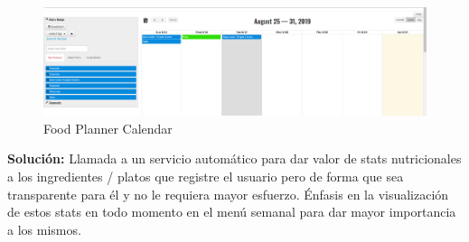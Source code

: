 \documentclass[12pt, a4paper, twoside]{book}
\begin{document}
\begin{itemize}
		\begin{center}
			\begin{figure}[H]
				\centering
				\includegraphics[width=15cm]{Imagenes/FoodPlannerCalendar.png}
				\caption{Food Planner Calendar}\label{Food Planner Calendar}
			\end{figure}
		\end{center}
		\textbf{Solución:} Llamada a un servicio automático para dar valor de stats nutricionales a los ingredientes / platos que registre el usuario pero de forma que sea transparente para él y no le requiera mayor esfuerzo. Énfasis en la visualización de estos stats en todo momento en el menú semanal para dar mayor importancia a los mismos.
	\end{itemize}	
\end{document}
